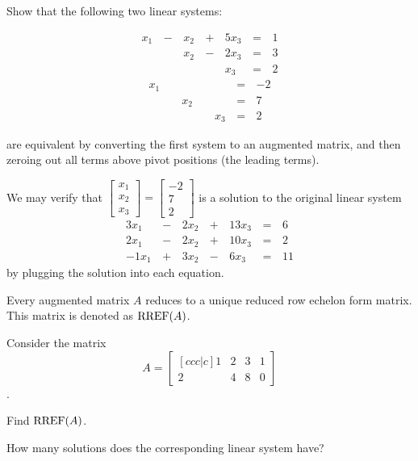 \begin{applicationActivities}{2}{5}
\begin{activity}{10}
  Show that the following two linear systems:
  \begin{multicols}{2}\noindent
    \begin{alignat*}{4}
       x_1 &\,-\,&  x_2  &\,+\,&  5x_3 &\,=\,& 1 \\
           &\, \,&  x_2 &\,-\,&  2x_3 &\,=\,& 3 \\
           &\, \,&      &\, \,&   x_3 &\,=\,& 2
    \end{alignat*}
      \begin{alignat*}{4}
         x_1 &\, \,&      &\, \,&       &\,=\,& -2 \\
             &\, \,&  x_2 &\, \,&       &\,=\,& 7 \\
             &\, \,&      &\, \,&   x_3 &\,=\,& 2
      \end{alignat*}
  \end{multicols}
  are equivalent by converting the first system to an augmented matrix,
  and then zeroing out all terms above pivot positions (the leading terms).
\end{activity}

\begin{remark}
  We may verify that \(\begin{bmatrix}x_1\\x_2\\x_3\end{bmatrix}=
  \begin{bmatrix}-2\\7\\2\end{bmatrix}\) is a solution to the
  original linear system
    \begin{alignat*}{4}
      3x_1 &\,-\,& 2x_2 &\,+\,& 13x_3 &\,=\,& 6 \\
      2x_1 &\,-\,& 2x_2 &\,+\,& 10x_3 &\,=\,& 2 \\
     -1x_1 &\,+\,& 3x_2 &\,-\,&  6x_3 &\,=\,& 11
    \end{alignat*}
  by plugging the solution into each equation.
\end{remark}

\begin{fact}
  Every augmented matrix \(A\) reduces to a unique reduced row echelon form
  matrix. This matrix is denoted as \(\operatorname{RREF}(A)\).
\end{fact}

\begin{activity}{10}
  Consider the matrix \[
  A = \begin{bmatrix}[ccc|c]
    1 & 2 & 3 & 1\\
    2 & 4 & 8 & 0
  \end{bmatrix}
  \].
  \begin{subactivity}
    Find \(\operatorname{RREF}(A)\).
  \end{subactivity}
  \begin{subactivity}
    How many solutions does the corresponding linear system have?
  \end{subactivity}
\end{activity}





\end{applicationActivities}

